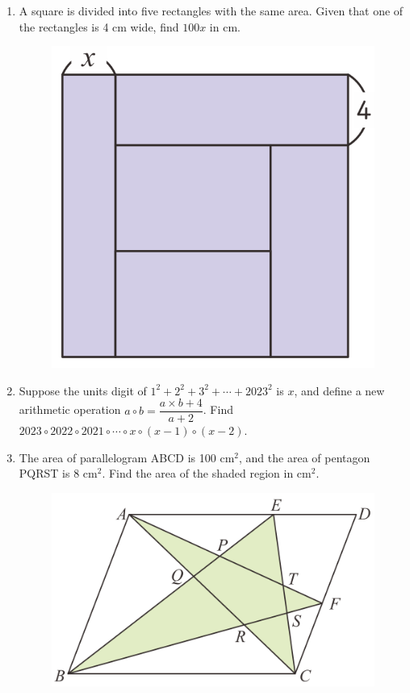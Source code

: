 \documentclass[12pt]{scrartcl}
\begin{document}
\begin{enumerate}[resume]
    \hrulefill \item A square is divided into five rectangles with the same area. Given that one of the rectangles is 4 cm wide, find $100x$ in cm.
    \begin{figure}[h]
        \centering
        \includegraphics[scale=0.4]{StarGen/0Figure/wmi2023G6B-num7.png}
    \end{figure}

    \hrulefill \item Suppose the units digit of $1^2 + 2^2 + 3^2 + \cdots + 2023^2$ is $x$, and define a new arithmetic operation $a \circ b = \dfrac{a \times b + 4}{a + 2}$. Find $2023 \circ 2022 \circ 2021 \circ \cdots \circ x \circ (x-1) \circ (x-2)$.

    
    \hrulefill
    
    \newpage
    \item The area of parallelogram ABCD is 100 cm$^2$, and the area of pentagon PQRST is 8 cm$^2$. Find the area of the shaded region in cm$^2$.
    \begin{figure}[h]
        \centering
        \includegraphics[scale=0.4]{StarGen/0Figure/wmi2023G6B-num9.png}
    \end{figure}


\end{enumerate}
\end{document}
